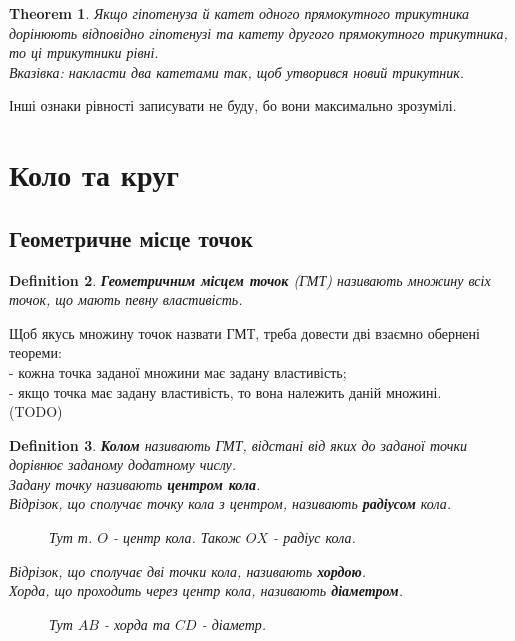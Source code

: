 \documentclass[a4paper, 10pt]{article}
\theoremstyle{theoremdd}
\newtheorem{theorem}{Theorem}[subsection]
\theoremstyle{theoremdd}
\theoremstyle{theoremdd}
\newtheorem{definition}[theorem]{Definition}
\theoremstyle{theoremdd}
\theoremstyle{theoremdd}
\theoremstyle{theoremdd}
\theoremstyle{theoremdd}
\theoremstyle{theoremdd}
\theoremstyle{theoremdd}
\begin{document}
\begin{theorem}
Якщо гіпотенуза й катет одного прямокутного трикутника дорінюють відповідно гіпотенузі та катету другого прямокутного трикутника, то ці трикутники рівні.\\
\textit{Вказівка: накласти два катетами так, щоб утворився новий трикутник.}
\end{theorem}
Інші ознаки рівності записувати не буду, бо вони максимально зрозумілі.
\newpage

\section{Коло та круг}
\subsection{Геометричне місце точок}
\begin{definition}
\textbf{Геометричним місцем точок} (ГМТ) називають множину всіх точок, що мають певну властивість.
\end{definition}
Щоб якусь множину точок назвати ГМТ, треба довести дві взаємно обернені теореми:\\
- кожна точка заданої множини має задану властивість;\\
- якщо точка має задану властивість, то вона належить даній множині.\\
(TODO)

\begin{definition}
\textbf{Колом} називають ГМТ, відстані від яких до заданої точки дорівнює заданому додатному числу.\\
Задану точку називають \textbf{центром кола}.\\
Відрізок, що сполучає точку кола з центром, називають \textbf{радіусом} кола.
\begin{figure}[H]
\centering
{}
\caption*{Тут т. $O$ - центр кола. Також $OX$ - радіус кола.}
\end{figure}
Відрізок, що сполучає дві точки кола, називають \textbf{хордою}.\\
Хорда, що проходить через центр кола, називають \textbf{діаметром}.
\begin{figure}[H]
\centering
{}
\caption*{Тут $AB$ - хорда та $CD$ - діаметр.}
\end{figure}
\end{definition}
\end{document}
